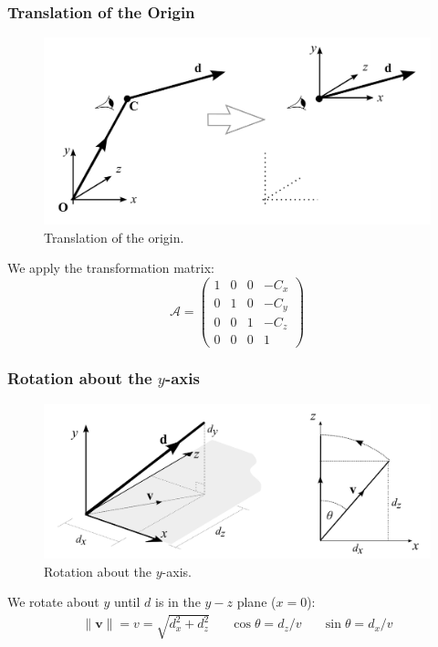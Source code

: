 \documentclass[11pt]{article}
\begin{document}
\subsubsection{Translation of the Origin}

\begin{figure}[htb!]
  \caption{Translation of the origin.}
  \includegraphics[scale=0.2]{transorigin}
  \centering
\end{figure}

We apply the transformation matrix:
\[
  \mathcal{A} =
  \begin{pmatrix}
    1 & 0 & 0 & -C_x \\
    0 & 1 & 0 & -C_y \\
    0 & 0 & 1 & -C_z \\
    0 & 0 & 0 & 1
  \end{pmatrix}
\]

\subsubsection{Rotation about the $y$-axis}
\begin{figure}[htb!]
  \caption{Rotation about the $y$-axis.}
  \includegraphics[scale=0.2]{roty}
  \centering
\end{figure}

We rotate about $y$ until $d$ is in the $y-z$ plane ($x = 0$):
\begin{align*}
  \lVert \bm{v} \lVert = v = \sqrt{d_x^2 + d_z^2} && \cos \theta = d_z / v && \sin \theta = d_x / v
\end{align*}
\end{document}
